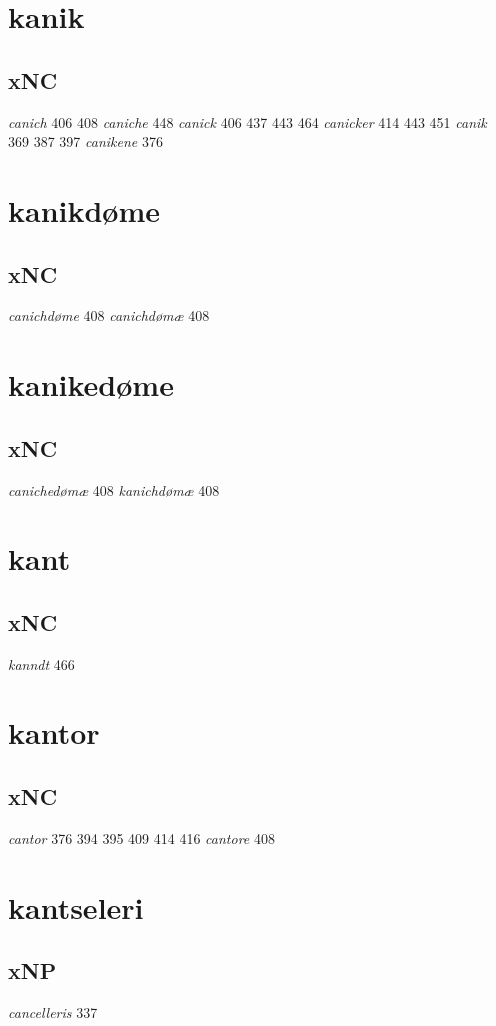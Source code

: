 \documentclass[a4paper,twocolumn]{article}
\begin{document}
\section{kanik}
\label{sec:org34891d0}
\subsection{xNC}
\label{sec:org168e7ae}
\emph{canich} 406 408 \emph{caniche} 448 \emph{canick} 406 437 443 464 \emph{canicker} 414 443 451 \emph{canik} 369 387 397 \emph{canikene} 376 
\section{kanikdøme}
\label{sec:orgf2547ad}
\subsection{xNC}
\label{sec:org81627d7}
\emph{canichdøme} 408 \emph{canichdømæ} 408 
\section{kanikedøme}
\label{sec:orgdcd791b}
\subsection{xNC}
\label{sec:org27c982c}
\emph{canichedømæ} 408 \emph{kanichdømæ} 408 
\section{kant}
\label{sec:org36afedc}
\subsection{xNC}
\label{sec:org9b68186}
\emph{kanndt} 466 
\section{kantor}
\label{sec:orgf11c38f}
\subsection{xNC}
\label{sec:orgb203b5e}
\emph{cantor} 376 394 395 409 414 416 \emph{cantore} 408 
\section{kantseleri}
\label{sec:org9150d3f}
\subsection{xNP}
\label{sec:org4f24352}
\emph{cancelleris} 337 
\end{document}
